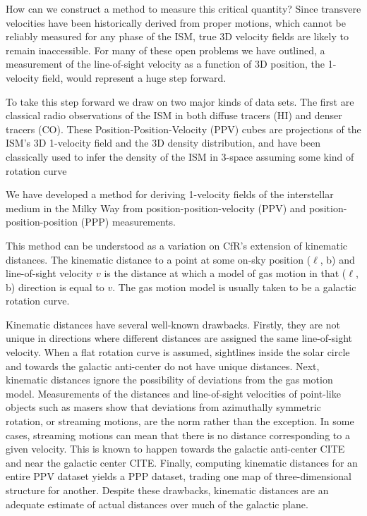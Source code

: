 How can we construct a method to measure this critical quantity? Since transvere velocities have been historically derived from proper motions, which cannot be reliably measured for any phase of the ISM, true 3D velocity fields are likely to remain inaccessible. 
For many of these open problems we have outlined, a measurement of the line-of-sight velocity as a function of 3D position, the 1-velocity field, would represent a huge step forward.

To take this step forward we draw on two major kinds of data sets. The first are classical radio observations of the ISM in both diffuse tracers (HI) and denser tracers (CO). These Position-Position-Velocity (PPV) cubes are projections of the ISM's 3D 1-velocity field and the 3D density distribution, and have been classically used to infer the density of the ISM in 3-space assuming some kind of rotation curve \citep[e.g.][]{Levine_2006}

We have developed a method for deriving 1-velocity fields of the interstellar medium in the Milky Way from position-position-velocity (PPV) and position-position-position (PPP) measurements. 

This method can be understood as a variation on CfR's extension of kinematic distances.
The kinematic distance to a point at some on-sky position ($\ell$, b) and line-of-sight velocity $v$ is the distance at which a model of gas motion in that ($\ell$, b) direction is equal to $v$.
The gas motion model is usually taken to be a galactic rotation curve. 

Kinematic distances have several well-known drawbacks.
Firstly, they are not unique in directions where different distances are assigned the same line-of-sight velocity.
When a flat rotation curve is assumed, sightlines inside the solar circle and towards the galactic anti-center do not have unique distances. 
Next, kinematic distances ignore the possibility of deviations from the gas motion model.
Measurements of the distances and line-of-sight velocities of point-like objects such as masers show that deviations from azimuthally symmetric rotation, or streaming motions, are the norm rather than the exception.
In some cases, streaming motions can mean that there is no distance corresponding to a given velocity. 
This is known to happen towards the galactic anti-center CITE and near the galactic center CITE.
Finally, computing kinematic distances for an entire PPV dataset yields a PPP dataset, trading one map of three-dimensional structure for another.
Despite these drawbacks, kinematic distances are an adequate estimate of actual distances over much of the galactic plane.

